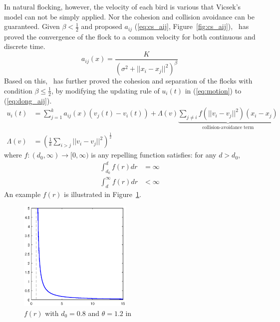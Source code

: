 In natural flocking, however, the velocity of each bird is various that Vicsek's model can not be simply applied. Nor the cohesion and collision avoidance can be guaranteed. Given $\beta<\frac{1}{2}$ and proposed $a_{ij}$ (\ref{eq:cs_aij}, Figure~\ref{fig:cs_aij}),~\cite{CuckerSmale2007} has proved the convergence of the flock to a common velocity for both continuous and discrete time.
\begin{equation}\label{eq:cs_aij}
a_{ij}(x)=\frac{K}{(\sigma^2+||x_i-x_j||^2)^{\beta}}
\end{equation}
Based on this,~\cite{CuckerDong2010} has further proved the cohesion and separation of the flocks with condition $\beta\leq\frac{1}{2}$, by modifying the updating rule of $u_i(t)$ in (\ref{eq:motion}) to (\ref{eq:dong_aij}).
\begin{equation}\label{eq:dong_aij}
\begin{aligned}
u_i(t)&=\sum^k_{j=1}a_{ij}(x)(v_j(t)-v_i(t))+\Lambda(v)\underbrace{\sum_{j\neq i}f(||v_i-v_j||^2)(x_i-x_j)}_{\text{collision-avoidance term}}\\
\Lambda(v)&=(\frac{1}{k}\sum_{i>j}||v_i-v_j||^2)^{\frac{1}{2}}
\end{aligned}
\end{equation}
where $f:(d_0,\infty)\to[0,\infty)$ is any repelling function satisfies: for any $d>d_0$,
\begin{equation}\label{eq:dong_f}
\begin{aligned}
\int_{d_0}^d f(r)dr&=\infty\\
\int_d^{\infty} f(r)dr&<\infty
\end{aligned}
\end{equation}
An example $f(r)$ is illustrated in Figure~\ref{fig:dong_f}.
\begin{figure}[htb]
  \centering
  \includegraphics[width=0.48\textwidth]{figure/dong_f.eps}
  \caption{$f(r)$ with $d_0=0.8$ and $\theta=1.2$ in ~\cite{CuckerDong2010}}
  \label{fig:dong_f}
\end{figure}

